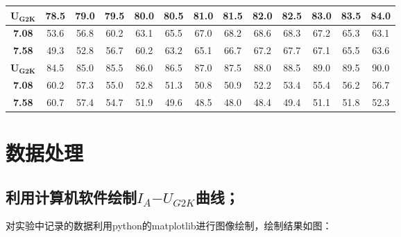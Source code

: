 \documentclass{ctexart}
\begin{document}
\begin{table}[h]
\begin{tabular}{ c | c c c c c c c c c c c c}
      \hline
      $\mathbf{U_{G2K}}$  & 78.5  & 79.0  & 79.5  & 80.0  & 80.5  & 81.0  & 81.5  & 82.0  & 82.5  & 83.0  & 83.5  & 84.0\\
      \hline
      \textbf{7.08} & 53.6  & 56.8  & 60.2  & 63.1  & 65.5  & 67.0  & 68.2  & 68.6  & 68.3  & 67.2  & 65.3  & 63.1 \\
      \textbf{7.58} & 49.3  & 52.8  & 56.7  & 60.2  & 63.2  & 65.1  & 66.7  & 67.2  & 67.7  & 67.1  & 65.5  & 63.6 \\
      \hline
      $\mathbf{U_{G2K}}$  & 84.5  & 85.0  & 85.5  & 86.0  & 86.5  & 87.0  & 87.5  & 88.0  & 88.5  & 89.0  & 89.5  & 90.0\\
      \hline
      \textbf{7.08} & 60.2  & 57.3  & 55.0  & 52.8  & 51.3  & 50.8  & 50.9  & 52.2  & 53.4  & 55.4  & 56.2  & 56.7 \\
      \textbf{7.58} & 60.7  & 57.4  & 54.7  & 51.9  & 49.6  & 48.5  & 48.0  & 48.4  & 49.4  & 51.1  & 51.8  & 52.3 \\
      \bottomrule
    \end{tabular}
\end{table}

\newpage
{}

\newpage

\section{数据处理}

\subsection{利用计算机软件绘制$I_A{-{}}U_{G2K}$曲线；}

对实验中记录的数据利用python的matplotlib进行图像绘制，绘制结果如图：
\end{document}
